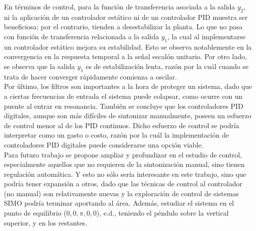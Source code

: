 \documentclass[journal]{IEEEtran}
\begin{document}
En términos de control, para la función de transferencia asociada a la salida $y_2$, ni la aplicación de un controlador estático ni de un controlador PID muestra ser beneficiosa; por el contrario, tienden a desestabilizar la planta. Lo que no pasa con función de transferencia relacionada a la salida $y_1$, la cual al implementarse un controlador estático mejora su estabilidad. Esto se observa notablemente en la convergencia en la respuesta temporal a la señal escalón unitario. Por otro lado, se observa que la salida $y_1$ es de estabilización lenta, razón por la cuál cuando se trata de hacer converger rápidamente comienza a oscilar.\\

Por último, los filtros son importantes a la hora de proteger un sistema, dado que a ciertas frecuencias de entrada el sistema puede colapsar, como ocurre con un puente al entrar en resonancia. También se concluye que los controladores PID digitales, aunque son más difíciles de sintonizar manualmente, poseen un esfuerzo de control menor al de los PID continuos. Dicho esfuerzo de control se podría interpretar como un gasto o costo, razón por la cuál la implementación de controladores PID digitales puede considerarse una opción viable.\\

Para futuro trabajo se propone ampliar y profundizar en el estudio de control, especialmente aquellos que no requieren de la sintonización manual, sino tienen regulación automática. Y esto no sólo sería interesante en este trabajo, sino que podría tener expansión a otros, dado que las técnicas de control al controlador (no manual) son relativamente nuevas y la exploración de control de sistemas SIMO podría terminar aportando al área. Además, estudiar el sistema en el punto de equilibrio ($0,0,\pi,0,0$), e.d., teniendo el péndulo sobre la vertical superior, y en los restantes. 




\newpage

\end{document}
